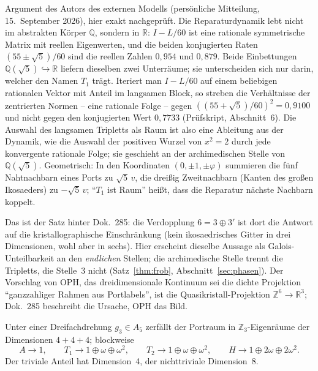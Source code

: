 \begin{remark}\label{rem:arch}
Argument des Autors des externen Modells (persönliche Mitteilung,
15.~September 2026), hier exakt nachgeprüft.
Die Reparaturdynamik lebt nicht im abstrakten Körper $\mathbb{Q}$, sondern in
$\mathbb{R}$: $I-L/60$ ist eine rationale symmetrische Matrix mit reellen
Eigenwerten, und die beiden konjugierten Raten $(55\pm\sqrt5)/60$ sind die
reellen Zahlen $0{,}954$ und $0{,}879$. Beide Einbettungen
$\mathbb{Q}(\sqrt5)\hookrightarrow\mathbb{R}$ liefern dieselben zwei
Unterräume; sie unterscheiden sich nur darin, welcher den Namen $T_1$ trägt.
Iteriert man $I-L/60$ auf einem beliebigen rationalen Vektor mit Anteil im
langsamen Block, so streben die Verhältnisse der zentrierten Normen -- eine
rationale Folge -- gegen $((55+\sqrt5)/60)^2=0{,}9100$ und nicht gegen den
konjugierten Wert $0{,}7733$ (Prüfskript, Abschnitt~6). Die Auswahl des
langsamen Tripletts als Raum ist also eine Ableitung aus der Dynamik, wie
die Auswahl der positiven Wurzel von $x^2=2$ durch jede konvergente
rationale Folge; sie geschieht an der archimedischen Stelle von
$\mathbb{Q}(\sqrt5)$. Geometrisch: In den Koordinaten $(0,\pm1,\pm\varphi)$
summieren die fünf Nahtnachbarn eines Ports zu $\sqrt5\,v$, die dreißig
Zweitnachbarn (Kanten des großen Ikosaeders) zu $-\sqrt5\,v$; \enquote{$T_1$
ist Raum} heißt, dass die Reparatur nächste Nachbarn koppelt.
\end{remark}

Das ist der Satz hinter Dok.~285: die Verdopplung $6=3\oplus3'$ ist dort
die Antwort auf die kristallographische Einschränkung (kein ikosaedrisches
Gitter in drei Dimensionen, wohl aber in sechs). Hier erscheint dieselbe
Aussage als Galois-Unteilbarkeit an den \emph{endlichen} Stellen; die
archimedische Stelle trennt die Tripletts, die Stelle~3 nicht
(Satz~\ref{thm:frob}, Abschnitt~\ref{sec:phasen}). Der Vorschlag von OPH, das
dreidimensionale Kontinuum sei die dichte Projektion \enquote{ganzzahliger
Rahmen aus Portlabels}, ist die Quasikristall-Projektion
$\mathbb{Z}^6\to\mathbb{R}^3$; Dok.~285 beschreibt die Ursache, OPH das Bild.

\begin{theorem}\label{thm:c3}
Unter einer Dreifachdrehung $g_3\in A_5$ zerfällt der Portraum in
$\mathbb{Z}_3$-Eigenräume der Dimensionen $4+4+4$; blockweise
\[
  A\to 1,\qquad T_1\to 1\oplus\omega\oplus\omega^2,\qquad
  T_2\to 1\oplus\omega\oplus\omega^2,\qquad H\to 1\oplus2\omega\oplus2\omega^2 .
\]
Der triviale Anteil hat Dimension~4, der nichttriviale Dimension~8.
\end{theorem}

